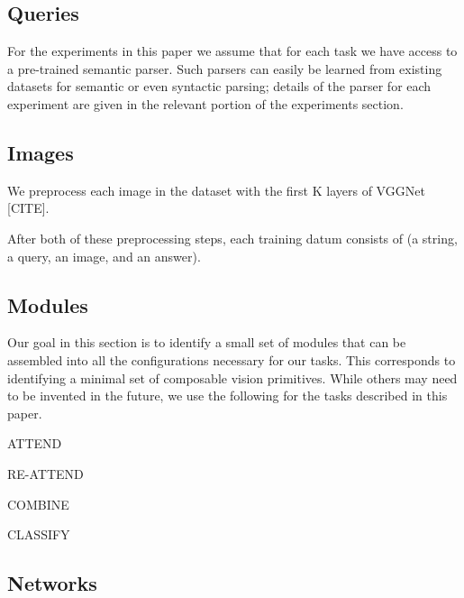 \documentclass{article} %
\theoremstyle{definition}
\theoremstyle{example}
\begin{document}
\subsection{Queries}

For the experiments in this paper we assume that for each task we have access to
a pre-trained semantic parser. Such parsers can easily be learned from existing
datasets for semantic or even syntactic parsing; details of the parser for each
experiment are given in the relevant portion of the experiments section.

\subsection{Images}

We preprocess each image in the dataset with the first K layers of VGGNet [CITE].

After both of these preprocessing steps, each training datum consists of (a
string, a query, an image, and an answer).

\subsection{Modules}

Our goal in this section is to identify a small set of modules that can be
assembled into all the configurations necessary for our tasks. This corresponds
to identifying a minimal set of composable vision primitives. While others  may
need to be invented in the future, we use the following for the tasks described
in this paper.

ATTEND

{
  \center
}

RE-ATTEND

{
  \center
}

COMBINE

{
  \center
}

CLASSIFY

{
  \center
}

\subsection{Networks}
\end{document}
